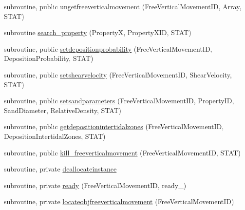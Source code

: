 \begin{DoxyCompactItemize}
subroutine, public \mbox{\hyperlink{namespacemodulefreeverticalmovement_a0dee0aecf95b688c425cff9d35e998aa}{ungetfreeverticalmovement}} (Free\+Vertical\+Movement\+ID, Array, S\+T\+AT)
\item 
subroutine \mbox{\hyperlink{namespacemodulefreeverticalmovement_a7533a239e57263d95d53d832615113be}{search\+\_\+property}} (PropertyX, Property\+X\+ID, S\+T\+AT)
\item 
subroutine, public \mbox{\hyperlink{namespacemodulefreeverticalmovement_af516e84df0a0267e1305aeeba0e3d131}{setdepositionprobability}} (Free\+Vertical\+Movement\+ID, Deposition\+Probability, S\+T\+AT)
\item 
subroutine, public \mbox{\hyperlink{namespacemodulefreeverticalmovement_a09fc990d2d2ac27c1577ca26d525281a}{setshearvelocity}} (Free\+Vertical\+Movement\+ID, Shear\+Velocity, S\+T\+AT)
\item 
subroutine, public \mbox{\hyperlink{namespacemodulefreeverticalmovement_a9259d59598e55228b4b8a0ac729e3373}{setsandparameters}} (Free\+Vertical\+Movement\+ID, Property\+ID, Sand\+Diameter, Relative\+Density, S\+T\+AT)
\item 
subroutine, public \mbox{\hyperlink{namespacemodulefreeverticalmovement_a7aea36a1bc080954215034040adc4468}{getdepositionintertidalzones}} (Free\+Vertical\+Movement\+ID, Deposition\+Intertidal\+Zones, S\+T\+AT)
\item 
subroutine, public \mbox{\hyperlink{namespacemodulefreeverticalmovement_a73edd544e82908b2861ea9c544516ab3}{kill\+\_\+freeverticalmovement}} (Free\+Vertical\+Movement\+ID, S\+T\+AT)
\item 
subroutine, private \mbox{\hyperlink{namespacemodulefreeverticalmovement_a336eabf740dc9afccbeae27f1bd4c8f4}{deallocateinstance}}
\item 
subroutine, private \mbox{\hyperlink{namespacemodulefreeverticalmovement_a6822a6ac8c2596feb6110b6fa936b42b}{ready}} (Free\+Vertical\+Movement\+ID, ready\+\_\+)
\item 
subroutine, private \mbox{\hyperlink{namespacemodulefreeverticalmovement_a5b77a0a606cd82e8b48959c866cc4029}{locateobjfreeverticalmovement}} (Free\+Vertical\+Movement\+ID)
\end{DoxyCompactItemize}
